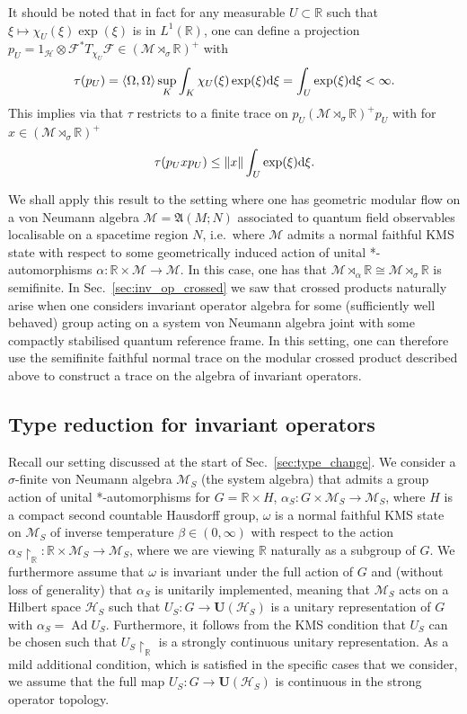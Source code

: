 \documentclass[sn-mathphys-num]{sn-jnl}%
\newcommand{\RR}{\mathbb{R}}
\newcommand{\HH}{\mathcal{H}}
\newcommand{\MM}{\mathcal{M}}
\DeclareMathOperator{\Ad}{Ad}
\newcommand{\diff}{\textup{d}}
\numberwithin{equation}{section}
\theoremstyle{thmstyleone}%
\theoremstyle{thmstyletwo}%
\theoremstyle{thmstylethree}%
\begin{document}
It should be noted that in fact for any measurable $U\subset\RR$ such that $\xi\mapsto \chi_U(\xi)\exp(\xi)$ is in $L^1(\RR)$, one can define a projection $p_U=1_{\HH}\otimes \mathcal{F}^*T_{\chi_U}\mathcal{F}\in(\MM\rtimes_{\sigma}\RR)^+$ with
\begin{equation}
    \tau(p_U)=\langle \Omega,\Omega\rangle \sup_K\int_K\chi_U(\xi)\exp(\xi)\diff\xi=\int_U\exp(\xi)\diff\xi<\infty.
\end{equation} This implies via \cite[Eq.~V.2.2]{Takesaki2001} that $\tau$ restricts to a finite trace on $p_U(\MM\rtimes_{\sigma}\RR)^+p_U$ with for $x\in (\MM\rtimes_{\sigma}\RR)^+$
\begin{equation}
    \tau(p_Uxp_U)\leq\Vert x\Vert\int_U\exp(\xi)\diff \xi.
\end{equation}


We shall apply this result to the setting where one has geometric modular flow on a von Neumann algebra $\MM=\mathfrak{A}(M;N)$ associated to quantum field observables localisable on a spacetime region $N$, i.e.\ where $\MM$ admits a normal faithful KMS state with respect to some geometrically induced action of unital *-automorphisms $\alpha:\RR\times\MM\to\MM$. In this case, one has that $\MM\rtimes_{\alpha}\RR\cong \MM\rtimes_{\sigma}\RR$ is semifinite. In Sec.\ \ref{sec:inv_op_crossed} we saw that crossed products naturally arise when one considers invariant operator algebra for some (sufficiently well behaved) group acting on a system von Neumann algebra joint with some compactly stabilised quantum reference frame. In this setting, one can therefore use the semifinite faithful normal trace on the modular crossed product described above to construct a trace on the algebra of invariant operators.

\subsection{Type reduction for invariant operators}
\label{sec:type_change_thm}
Recall our setting discussed at the start of Sec.\ \ref{sec:type_change}.
We consider a $\sigma$-finite von Neumann algebra $\MM_S$ (the system algebra) that admits a group action of unital *-automorphisms for $G=\RR\times H$, $\alpha_S:G\times\MM_S\to\MM_S$, where $H$ is a compact second countable Hausdorff group, $\omega$ is a normal faithful KMS state on $\MM_S$ of inverse temperature $\beta\in(0,\infty)$ with respect to the action $\alpha_S\restriction_\RR:\RR\times\MM_S\to\MM_S$, where we are viewing $\RR$ naturally as a subgroup of $G$. We furthermore assume that $\omega$ is invariant under the full action of $G$ and (without loss of generality) that $\alpha_S$ is unitarily implemented, meaning that $\MM_S$ acts on a Hilbert space $\HH_S$ such that $U_S:G\to\mathbf{U}(\HH_S)$ is a unitary representation of $G$ with $\alpha_S=\Ad U_S$. Furthermore, it follows from the KMS condition that $U_S$ can be chosen such that $U_S\restriction_\RR$ is a strongly continuous unitary representation. As a mild additional condition, which is satisfied in the specific cases that we consider, we assume that the full map $U_S:G\to \mathbf{U}(\HH_S)$ is continuous in the strong operator topology. 
\end{document}
